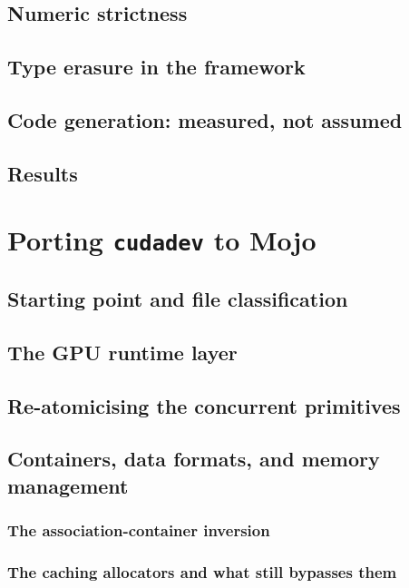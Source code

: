 \documentclass[11pt,a4paper]{report}
\begin{document}
\section{Numeric strictness}
\section{Type erasure in the framework}
\section{Code generation: measured, not assumed}
\section{Results}

\chapter{Porting \texttt{cudadev} to Mojo}
\section{Starting point and file classification}
\section{The GPU runtime layer}
\section{Re-atomicising the concurrent primitives}
\section{Containers, data formats, and memory management}
\subsection{The association-container inversion}
\subsection{The caching allocators and what still bypasses them}
\end{document}
